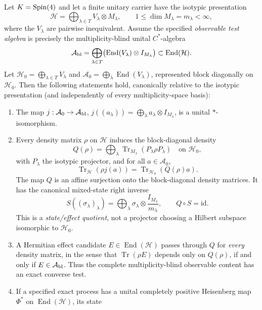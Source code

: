 \documentclass[12pt,a4paper]{article}
\begin{document}
\begin{theorem}
\label{p2b:thm:v293-operational-multiplicity-quotient}
Let $K=\mathrm{Spin}(4)$ and let a finite unitary carrier have the isotypic
presentation
\[
 \mathcal H=\bigoplus_{\lambda\in T}V_\lambda\otimes M_\lambda,
 \qquad 1\le\dim M_\lambda=m_\lambda<\infty,
\]
where the $V_\lambda$ are pairwise inequivalent. Assume the specified
\emph{observable test algebra} is precisely the multiplicity-blind
unital $C^*$-algebra
\[
 \mathcal A_{\rm bl}
 =\bigoplus_{\lambda\in T}
   \bigl(\operatorname{End}(V_\lambda)\otimes I_{M_\lambda}\bigr)
 \subset\operatorname{End}(\mathcal H).
\]
Let $\mathcal H_0=\bigoplus_{\lambda\in T}V_\lambda$ and
$\mathcal A_0=\bigoplus_\lambda\operatorname{End}(V_\lambda)$,
represented block diagonally on $\mathcal H_0$. Then the following
statements hold, canonically relative to the isotypic presentation (and
independently of every multiplicity-space basis):
\begin{enumerate}[label=(\roman*),leftmargin=2em]
\item The map $j:\mathcal A_0\to\mathcal A_{\rm bl}$,
$j((a_\lambda))=\bigoplus_\lambda a_\lambda\otimes I_{M_\lambda}$,
is a unital $*$-isomorphism.
\item Every density matrix $\rho$ on $\mathcal H$ induces the
block-diagonal density
\[
 Q(\rho)=\bigoplus_\lambda
 \operatorname{Tr}_{M_\lambda}(P_\lambda\rho P_\lambda)
 \quad\text{on }\mathcal H_0,
\]
with $P_\lambda$ the isotypic projector, and for all
$a\in\mathcal A_0$,
\[
 \operatorname{Tr}_{\mathcal H}(\rho j(a))
 =\operatorname{Tr}_{\mathcal H_0}(Q(\rho)a).
\]
The map $Q$ is an affine surjection onto the block-diagonal density
matrices. It has the canonical mixed-state right inverse
\[
 S((\sigma_\lambda)_\lambda)
 =\bigoplus_\lambda\sigma_\lambda\otimes\frac{I_{M_\lambda}}{m_\lambda},
 \qquad Q\circ S=\mathrm{id}.
\]
This is a \emph{state/effect quotient}, not a projector choosing a Hilbert
subspace isomorphic to $\mathcal H_0$.
\item A Hermitian effect candidate $E\in\operatorname{End}(\mathcal H)$
passes through $Q$ for \emph{every} density matrix, in the sense that
$\operatorname{Tr}(\rho E)$ depends only on $Q(\rho)$, if and only if
$E\in\mathcal A_{\rm bl}$. Thus the complete multiplicity-blind
observable content has an exact converse test.
\item If a specified exact process has a unital completely positive
Heisenberg map $\Phi^*$ on $\operatorname{End}(\mathcal H)$, its state

\end{enumerate}
\end{theorem}
\end{document}
